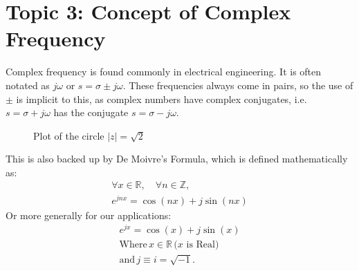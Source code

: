 \documentclass[../notes-main.tex]{subfiles}
\begin{document}
\section{Topic 3: Concept of Complex Frequency}
Complex frequency is found commonly in electrical engineering. It is often notated as \( j\omega \) or \( s = \sigma \pm j \omega \). These frequencies always come in pairs, so the use of \( \pm \) is implicit to this, as complex numbers have complex conjugates, i.e.
\(s = \sigma + j \omega \) has the conjugate \(s = \sigma - j\omega \).
\begin{figure}[H]
    \centering
    \caption{Plot of the circle \(|z| = \sqrt{2}\)}\label{fig:pgfplots-complex-plane-1}
\end{figure}
\vspace{-1em}
\noindent This is also backed up by De Moivre's Formula, which is defined mathematically as:
\begin{gather}
    \forall x \in \mathbb{R}, \quad \forall n \in \mathbb{Z}, \\
    e^{j n x} = \cos(n x) + j \sin(n x)
\end{gather}\label{eq:de-moivre-formula}
Or more generally for our applications:
\begin{gather}
    e^{jx} = \cos(x) + j\sin(x) \\
    \text{Where} \, x \in \mathbb{R}\, \text{(\(x\) is Real)} \\
    \text{and} \, j \equiv i = \sqrt{-1}.
\end{gather}\label{eq:de-moivre-formula-general}
\end{document}
